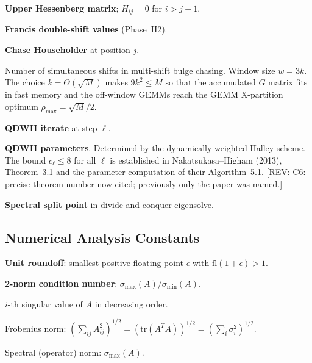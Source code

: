 \documentclass[11pt]{article}
\newcommand{\REV}[1]{\textcolor{blue!60!black}{\small\textsf{[REV: #1]}}}
\begin{document}
\begin{description}[leftmargin=3.5em, labelwidth=3em, labelsep=0.5em,
                    style=nextline, font=\normalfont\itshape]

\item[$H$] \textbf{Upper Hessenberg matrix}; $H_{ij} = 0$ for $i > j+1$.

\item[$\mu_1,\, \mu_2$] \textbf{Francis double-shift values} (Phase~H2).

\item[$G_j$] \textbf{Chase Householder} at position $j$.

\item[$k$ (multi-shift parameter)] Number of simultaneous shifts in
  multi-shift bulge chasing. Window size $w = 3k$. The choice
  $k = \Theta(\sqrt{M})$ makes $9k^2 \le M$ so that the accumulated
  $G$ matrix fits in fast memory and the off-window GEMMs reach the
  GEMM X-partition optimum $\rho_{\max} = \sqrt{M}/2$.

\item[$X_\ell$] \textbf{QDWH iterate} at step $\ell$.

\item[$a_\ell, b_\ell, c_\ell$] \textbf{QDWH parameters}. Determined
  by the dynamically-weighted Halley scheme. The bound $c_\ell \le 8$
  for all $\ell$ is established in Nakatsukasa--Higham (2013),
  Theorem~3.1 and the parameter computation of their Algorithm~5.1.
  \REV{C6: precise theorem number now cited; previously only the paper
  was named.}

\item[$\sigma$] \textbf{Spectral split point} in divide-and-conquer
  eigensolve.

\end{description}

\subsection*{Numerical Analysis Constants}

\begin{description}[leftmargin=3.5em, labelwidth=3em, labelsep=0.5em,
                    style=nextline, font=\normalfont\itshape]

\item[$\mathbf{u}$] \textbf{Unit roundoff}: smallest positive
  floating-point $\epsilon$ with $\mathrm{fl}(1+\epsilon) > 1$.

\item[$\kappa_2(A)$] \textbf{2-norm condition number}:
  $\sigma_{\max}(A)/\sigma_{\min}(A)$.

\item[$\sigma_i(A)$] $i$-th singular value of $A$ in decreasing order.

\item[$\|A\|_F$] Frobenius norm: $(\sum_{ij}A_{ij}^2)^{1/2} =
  (\mathrm{tr}(A^T A))^{1/2} = (\sum_i \sigma_i^2)^{1/2}$.

\item[$\|A\|_2$] Spectral (operator) norm: $\sigma_{\max}(A)$.

\end{description}
\end{document}
